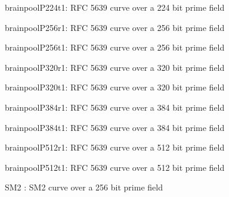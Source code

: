 \item   brainpoolP224t1: RFC 5639 curve over a 224 bit prime field
\item   brainpoolP256r1: RFC 5639 curve over a 256 bit prime field
\item   brainpoolP256t1: RFC 5639 curve over a 256 bit prime field
\item   brainpoolP320r1: RFC 5639 curve over a 320 bit prime field
\item   brainpoolP320t1: RFC 5639 curve over a 320 bit prime field
\item   brainpoolP384r1: RFC 5639 curve over a 384 bit prime field
\item   brainpoolP384t1: RFC 5639 curve over a 384 bit prime field
\item   brainpoolP512r1: RFC 5639 curve over a 512 bit prime field
\item   brainpoolP512t1: RFC 5639 curve over a 512 bit prime field
\item   SM2       : SM2 curve over a 256 bit prime field
